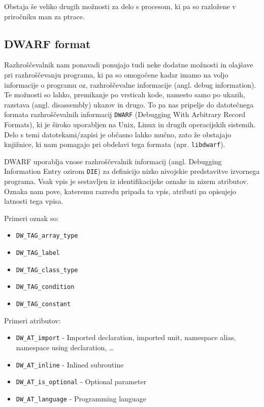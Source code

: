 \documentclass[a4paper,notitlepage]{article}
\newcommand{\code}[1]{\texttt{#1}}
\begin{document}
Obstaja še veliko drugih možnosti za delo s procesom, ki pa so razložene v priročniku man za ptrace\cite{ptrace-man-page}.

\subsection{DWARF format}

Razhroščevalnik nam ponavadi ponujajo tudi neke dodatne možnosti in olajšave pri razhroščevanju programa, ki pa so omogočene kadar imamo na voljo informacije o programu oz, razhroščevalne informacije (angl. debug information).
Te možnosti so lahko, premikanje po vrsticah kode, namesto samo po ukazih, razstava (angl. disassembly) ukazov in drugo.
To pa nas pripelje do datotečnega formata razhroščevalnih informacij \code{DWARF} (Debugging With Arbitrary Record Formats)\cite{dwarf-web-page}, ki je široko uporabljen na Unix, Linux in drugih operacijskih sistemih.
Delo s temi datotekami/zapisi je občasno lahko mučno, zato že obstajajo knjižnice, ki nam pomagajo pri obdelavi tega formata (npr. \code{libdwarf}\cite{libdwarf}).

DWARF uporablja vnose razhroščevalnik informacij (angl. Debugging Information Entry ozirom \code{DIE}) za definicijo nizko nivojskie predstavitve izvornega programa.
Vsak vpis je sestavljen iz identifikacijske oznake in nizem atributov. Oznaka nam pove, kateremu razredu pripada ta vpis, atributi pa opisujejo latnosti tega vpisa.

Primeri oznak so:
\begin{itemize}
    \item \code{DW_TAG_array_type}
    \item \code{DW_TAG_label}
    \item \code{DW_TAG_class_type}
    \item \code{DW_TAG_condition}
    \item \code{DW_TAG_constant}
\end{itemize}

Primeri atributov:

\begin{itemize}
    \item \code{DW_AT_import} - Imported declaration, imported unit, namespace alias, namespace using declaration, \ldots
    \item \code{DW_AT_inline} - Inlined subroutine
    \item \code{DW_AT_is_optional} - Optional parameter
    \item \code{DW_AT_language} - Programming language
\end{itemize}
\end{document}
